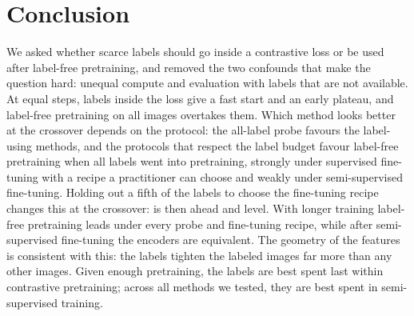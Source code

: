 \section{Conclusion}
\label{sec:conclusion}
We asked whether scarce labels should go inside a contrastive loss or be used after label-free pretraining,
and removed the two confounds that make the question hard: unequal compute and evaluation with labels that
are not available. At equal steps, labels inside the loss give a fast start and an early plateau, and
label-free pretraining on all images overtakes them. Which method looks better at the crossover depends on
the protocol: the all-label probe favours the label-using methods, and the protocols that respect the label
budget favour label-free pretraining when all labels went into pretraining, strongly under supervised fine-tuning
with a recipe a practitioner can choose and weakly under semi-supervised fine-tuning. Holding out a fifth of the
labels to choose the fine-tuning recipe changes this at the crossover: \supcon is then ahead and \union level. With longer training label-free pretraining
leads under every probe and fine-tuning recipe, while after semi-supervised fine-tuning the encoders are
equivalent. The geometry of the features is consistent with this: the labels tighten the labeled images
far more than any other images. Given enough pretraining, the labels
are best spent last within contrastive pretraining; across all methods we tested, they are best spent in semi-supervised training.
